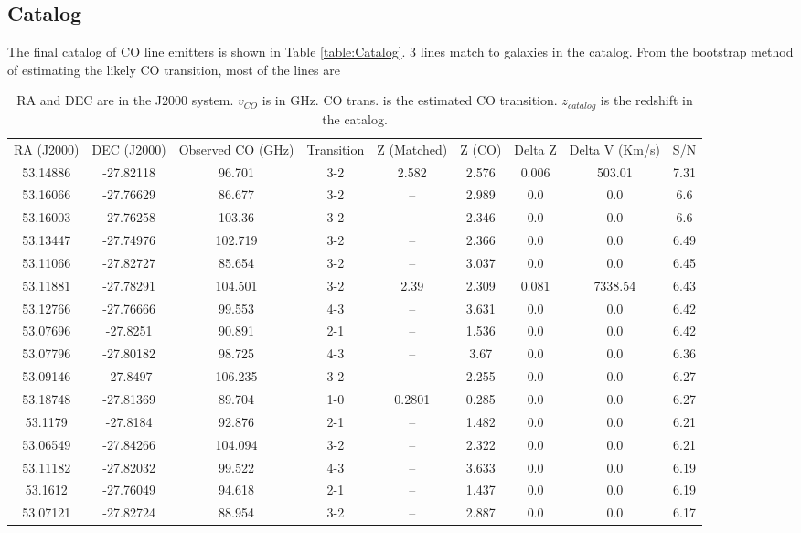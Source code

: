\subsection{Catalog}

The final catalog of CO line emitters is shown in Table \ref{table:Catalog}. 3 lines match to galaxies in the catalog. From the bootstrap method of estimating the likely CO transition, most of the lines are 

\begin{table}
\centering
\caption{RA and DEC are in the J2000 system. $v_{CO}$ is in GHz. CO trans. is the estimated CO transition. $z_{catalog}$ is the redshift in the catalog. }
\begin{tabular}{ccccccccc}
RA (J2000) & DEC (J2000) & Observed CO (GHz) & Transition & Z (Matched) & Z (CO) & Delta Z & Delta V (Km/s) & S/N \\
53.14886 & -27.82118 & 96.701 & 3-2 & 2.582 & 2.576 & 0.006 & 503.01 & 7.31 \\
53.16066 & -27.76629 & 86.677 & 3-2 & -- & 2.989 & 0.0 & 0.0 & 6.6 \\
53.16003 & -27.76258 & 103.36 & 3-2 & -- & 2.346 & 0.0 & 0.0 & 6.6 \\
53.13447 & -27.74976 & 102.719 & 3-2 & -- & 2.366 & 0.0 & 0.0 & 6.49 \\
53.11066 & -27.82727 & 85.654 & 3-2 & -- & 3.037 & 0.0 & 0.0 & 6.45 \\
53.11881 & -27.78291 & 104.501 & 3-2 & 2.39 & 2.309 & 0.081 & 7338.54 & 6.43 \\
53.12766 & -27.76666 & 99.553 & 4-3 & -- & 3.631 & 0.0 & 0.0 & 6.42 \\
53.07696 & -27.8251 & 90.891 & 2-1 & -- & 1.536 & 0.0 & 0.0 & 6.42 \\
53.07796 & -27.80182 & 98.725 & 4-3 & -- & 3.67 & 0.0 & 0.0 & 6.36 \\
53.09146 & -27.8497 & 106.235 & 3-2 & -- & 2.255 & 0.0 & 0.0 & 6.27 \\
53.18748 & -27.81369 & 89.704 & 1-0 & 0.2801 & 0.285 & 0.0 & 0.0 & 6.27 \\
53.1179 & -27.8184 & 92.876 & 2-1 & -- & 1.482 & 0.0 & 0.0 & 6.21 \\
53.06549 & -27.84266 & 104.094 & 3-2 & -- & 2.322 & 0.0 & 0.0 & 6.21 \\
53.11182 & -27.82032 & 99.522 & 4-3 & -- & 3.633 & 0.0 & 0.0 & 6.19 \\
53.1612 & -27.76049 & 94.618 & 2-1 & -- & 1.437 & 0.0 & 0.0 & 6.19 \\
53.07121 & -27.82724 & 88.954 & 3-2 & -- & 2.887 & 0.0 & 0.0 & 6.17 \\

\end{tabular}
\end{table}
